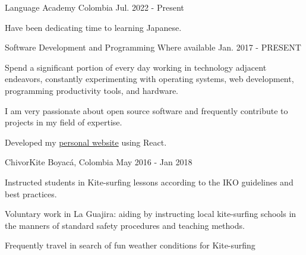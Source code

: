 

\begin{cventries}

	{Language Academy} %
	{Colombia} %
	{Jul. 2022 {-} Present} %
	{
		\begin{cvitems} %
			\item {Have been dedicating time to learning Japanese.}
		\end{cvitems}
	}

	{Software Development and Programming} %
	{Where available} %
	{Jan. 2017 {-} PRESENT} %
	{
		\begin{cvitems} %
			\item {Spend a significant portion of every day working in technology adjacent endeavors, constantly experimenting with operating systems, web development, programming productivity tools, and hardware.}
			\item {I am very passionate about open source software and frequently contribute to projects in my field of expertise.}
			\item {Developed my \href{https://mantimantilla.github.io/}{personal website} using React.}
		\end{cvitems}
	}

	{ChivorKite} %
	{Boyacá, Colombia} %
	{May 2016 {-} Jan 2018 } %
	{
		\begin{cvitems} %
			\item {Instructed students in Kite-surfing lessons according to the IKO guidelines and best practices.}
			\item {Voluntary work in La Guajira: aiding by instructing local kite-surfing schools in the manners
			            of standard safety procedures and teaching methods.}
			\item {Frequently travel in search of fun weather conditions for Kite-surfing}
		\end{cvitems}
	}


\end{cventries}
